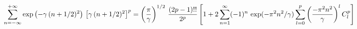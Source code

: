 \begin{equation}
  \label{eq:gentheta}
\sum\limits_{n = -\infty}^{+\infty} \exp\left( -\gamma\,(n+1/2)^2 \right) \,
\left[ \gamma \, (n+1/2)^2 \right]^p 
= \left( {\pi \over \gamma} \right)^{1/2} \, {(2p-1)!! \over 2^p}
\left[ 1 + 2 \sum\limits_{n=1}^\infty (-1)^n \, \exp(-\pi^2 n^2/\gamma)
\sum\limits_{l=0}^p \left( {-\pi^2 n^2 \over \gamma} \right)^l C_l^p \right]
\end{equation}

